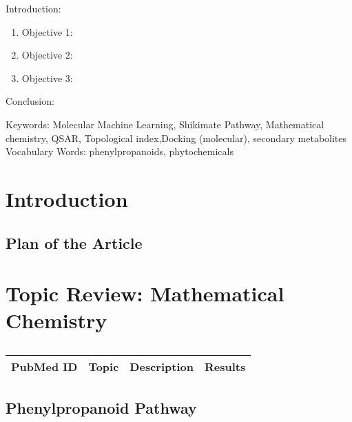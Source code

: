

\twocolumn
\scriptsize
\begin{frontmatter}
		\title{}
		\author{}
		\address{The Mathematical Learning Space}
\end{frontmatter}	

Introduction:
\begin{enumerate}
\item Objective 1:
\item Objective 2:
\item Objective 3:
\end{enumerate}
Conclusion:

Keywords:  Molecular Machine Learning, Shikimate Pathway, Mathematical chemistry, QSAR, Topological index,Docking (molecular), secondary  metabolites
Vocabulary Words: phenylpropanoids, phytochemicals

\section{Introduction}


\subsection{Plan of the Article}

\section{Topic Review: Mathematical Chemistry}

\centering	
\begin{table}[H]\tiny
	\caption{}	
	\begin{tabular}{p{1cm}p{1cm}|p{4cm}|l}
		\hline	
		PubMed ID & Topic & Description & Results \\
		\hline 
		\hline 
	\end{tabular}
\end{table}

\subsection{Phenylpropanoid Pathway}



